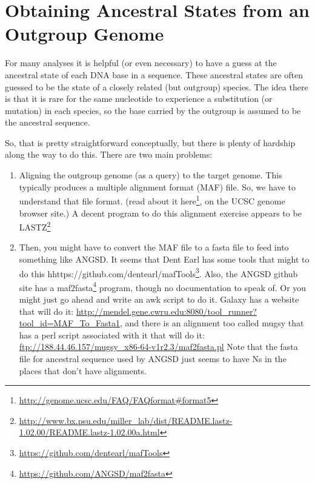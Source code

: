 \documentclass[]{krantz}
\renewcommand{\href}[2]{#2\footnote{\url{#1}}}
\begin{document}
\hypertarget{obtaining-ancestral-states-from-an-outgroup-genome}{%
\section{Obtaining Ancestral States from an Outgroup Genome}\label{obtaining-ancestral-states-from-an-outgroup-genome}}

For many analyses it is helpful (or even necessary) to have a guess at the ancestral
state of each DNA base in a sequence. These ancestral states are often guessed to be the
state of a closely related (but outgroup) species. The idea there is that it is rare for
the same nucleotide to experience a substitution (or mutation) in each species, so the
base carried by the outgroup is assumed to be the ancestral sequence.

So, that is pretty straightforward conceptually, but there is plenty of hardship
along the way to do this. There are two main problems:

\begin{enumerate}
\def\labelenumi{\arabic{enumi}.}
\item
  Aligning the outgroup genome (as a query) to the target genome. This typically
  produces a multiple alignment format (MAF) file. So, we have to understand that
  file format. (read about it \href{http://genome.ucsc.edu/FAQ/FAQformat\#format5}{here}, on the
  UCSC genome browser site.) A decent program to do this alignment exercise appears to
  be \href{http://www.bx.psu.edu/miller_lab/dist/README.lastz-1.02.00/README.lastz-1.02.00a.html}{LASTZ}
\item
  Then, you might have to convert the MAF file to a fasta file to feed into something
  like ANGSD. It seems that Dent Earl has some tools that might to do this \href{https://github.com/dentearl/mafTools}{hhttps://github.com/dentearl/mafTools}. Also, the ANGSD github site has a \href{https://github.com/ANGSD/maf2fasta}{maf2fasta} program, though no
  documentation to speak of. Or you might just go ahead and write an awk script to do it.
  Galaxy has a website that will do it: \url{http://mendel.gene.cwru.edu:8080/tool_runner?tool_id=MAF_To_Fasta1}, and there is an alignment too called mugsy
  that has a perl script associated with it that will do it: \url{ftp://188.44.46.157/mugsy_x86-64-v1r2.3/maf2fasta.pl}
  Note that the fasta file for ancestral sequence used by ANGSD just seems to have Ns in the places that don't have alignments.
\end{enumerate}
\end{document}
